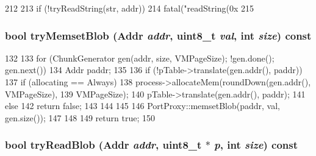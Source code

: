 \begin{DoxyCode}
212 {
213     if (!tryReadString(str, addr))
214         fatal("readString(0x%
215 }
\end{DoxyCode}
\hypertarget{classSETranslatingPortProxy_aa7b620f0665adb8f264d5a197cd34962}{
\subsubsection[{tryMemsetBlob}]{\setlength{\rightskip}{0pt plus 5cm}bool tryMemsetBlob ({\bf Addr} {\em addr}, \/  uint8\_\-t {\em val}, \/  int {\em size}) const}}
\label{classSETranslatingPortProxy_aa7b620f0665adb8f264d5a197cd34962}



\begin{DoxyCode}
132 {
133     for (ChunkGenerator gen(addr, size, VMPageSize); !gen.done(); gen.next()) {
134         Addr paddr;
135 
136         if (!pTable->translate(gen.addr(), paddr)) {
137             if (allocating == Always) {
138                 process->allocateMem(roundDown(gen.addr(), VMPageSize),
139                                      VMPageSize);
140                 pTable->translate(gen.addr(), paddr);
141             } else {
142                 return false;
143             }
144         }
145 
146         PortProxy::memsetBlob(paddr, val, gen.size());
147     }
148 
149     return true;
150 }
\end{DoxyCode}
\hypertarget{classSETranslatingPortProxy_aca06672df50af8d578c89cfe876c91ee}{
\subsubsection[{tryReadBlob}]{\setlength{\rightskip}{0pt plus 5cm}bool tryReadBlob ({\bf Addr} {\em addr}, \/  uint8\_\-t $\ast$ {\em p}, \/  int {\em size}) const}}
\label{classSETranslatingPortProxy_aca06672df50af8d578c89cfe876c91ee}



